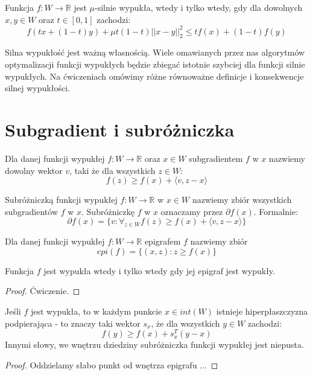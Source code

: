 \documentclass[10pt,a4paper,draft]{report}
\begin{document}
\begin{definition} 
Funkcja $f: W \rightarrow \mathbb{R}$ jest $\mu$-silnie wypukła, wtedy i tylko wtedy, gdy dla dowolnych $x,y \in W$ oraz $t \in [0,1]$ zachodzi:
\[
f(tx + (1-t)y) + \mu t(1-t)||x-y||_2^2 \leq tf(x) + (1-t)f(y) 
\]
\end{definition}

Silna wypukłość jest ważną własnością. Wiele omawianych przez nas algorytmów optymalizacji funkcji wypukłych będzie zbiegać istotnie szybciej dla funkcji silnie wypukłych. Na ćwiczeniach omówimy różne równoważne definicje i konsekwencje silnej wypukłości.


\section{Subgradient i subróżniczka}



\begin{definition}[Subgradient]
Dla danej funkcji wypukłej $f : W \rightarrow \mathbb{R}$ oraz $x \in W$ subgradientem $f$ w $x$ nazwiemy dowolny wektor $v$, taki że dla wszystkich $z \in W$:
\[
f(z) \geq f(x) + \langle v , z - x \rangle
\]
\end{definition}

\begin{definition}[Subróżniczka]
Subróżniczką funkcji wypukłej $f: W \rightarrow \mathbb{R}$ w $x \in W$ nazwiemy zbiór wszystkich subgradientów $f$ w $x$. Subróżniczkę $f$ w $x$ oznaczamy przez $\partial f(x)$. Formalnie:
\[
\partial f(x) = \{ v : \forall_{z \in W} f(z) \geq f(x) + \langle v, z - x\rangle \}
\]
\end{definition}

\begin{definition}[Epigraf]
Dla danej funkcji wypukłej $f : W \rightarrow \mathbb{R}$ epigrafem $f$ nazwiemy zbiór
\[
epi (f) = \{ (x,z) : z \geq f(x) \}
\]
\end{definition}


\begin{theorem}
Funkcja $f$ jest wypukła wtedy i tylko wtedy gdy jej epigraf jest wypukły.
\end{theorem}
\begin{proof}
Ćwiczenie.
\end{proof}

\begin{theorem}
Jeśli $f$ jest wypukła, to w każdym punkcie $x \in int(W)$ istnieje hiperpłaszczyzna podpierająca - to znaczy taki wektor $s_x$, że dla wszystkich $y \in W$ zachodzi:
\[
f(y) \geq f(x) + s_x^T (y - x)
\]
Innymi słowy, we wnętrzu dziedziny subróżniczka funkcji wypukłej jest niepusta.
\end{theorem}
\begin{proof}
Oddzielamy słabo punkt od wnętrza epigrafu ... 
\end{proof}
\end{document}
